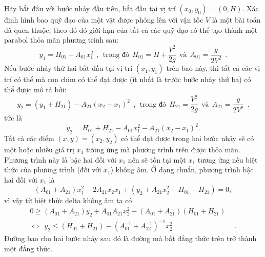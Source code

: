\begin{solution}
Hãy bắt đầu với bước nhảy đầu tiên, bắt đầu tại vị trí $(x_0,y_0)=(0,H)$. Xác định hình bao quỹ đạo của một vật được phóng lên với vận tốc $V$ là một bài toán đã quen thuộc, theo đó đó giới hạn của tất cả các quỹ đạo có thể tạo thành một parabol thỏa mãn phương trình sau:
\begin{equation}
y_1 = H_{01} - A_{01}x_1^2  \ \ , \ \ \text{trong đó} \ \  H_{01}=H+\frac{V^2}{2g}  \ \ \text{và} \ \ A_{01}=\frac{g}{2V^2} \ \ .
\end{equation}
Nếu bước nhảy thứ hai bắt đầu tại vị trí $(x_1,y_1)$ trên bao này, thì tất cả các vị trí có thể mà con chim có thể đạt được (ít nhất là trước bước nhảy thứ ba) có thể được mô tả bởi:
\begin{equation}
y_2 = \left(y_1 + H_{21} \right) - A_{21}\left(x_2-x_1\right)^2 \ \ , \ \ \text{trong đó} \ \  H_{21}=\frac{V^2}{2g}  \ \ \text{và} \ \ A_{21}=\frac{g}{2V^2} \ \ .
\end{equation}
tức là
\[y_2=H_{01}+H_{21}-A_{01}x_1^2-A_{21}(x_2-x_1)^2.\]
Tất cả các điểm $(x,y)=(x_2,y_2)$ có thể đạt được trong hai bước nhảy sẽ có một hoặc nhiều giá trị $x_1$ tương ứng mà phương trình trên được thỏa mãn. Phương trình này là bậc hai đối với $x_1$ nên sẽ tồn tại một $x_1$ tương ứng nếu biệt thức của phương trình (đối với $x_1$) không âm. Ở dạng chuẩn, phương trình bậc hai đối với $x_1$ là
\[(A_{01}+A_{21})x_1^2-2A_{21}x_2x_1+(y_2+A_{21}x_2^2-H_{01}-H_{21})=0,\]
vì vậy từ biệt thức delta không âm ta có
\begin{equation}
\begin{split}
0 \geq(A_{01}+A_{21})y_2+A_{01}A_{21}x_2^2-(A_{01}+A_{21})(H_{01}+H_{21}) &
\\
\Longleftrightarrow \ \ y_2 \leq (H_{01}+H_{21})-\left(A_{01}^{-1}+A_{12}^{-1}\right)^{-1}x_2^2 & \ \ .
\end{split}
\end{equation}
Đường bao cho hai bước nhảy sau đó là đường mà bất đẳng thức trên trở thành một đẳng thức.\\


\end{solution}
